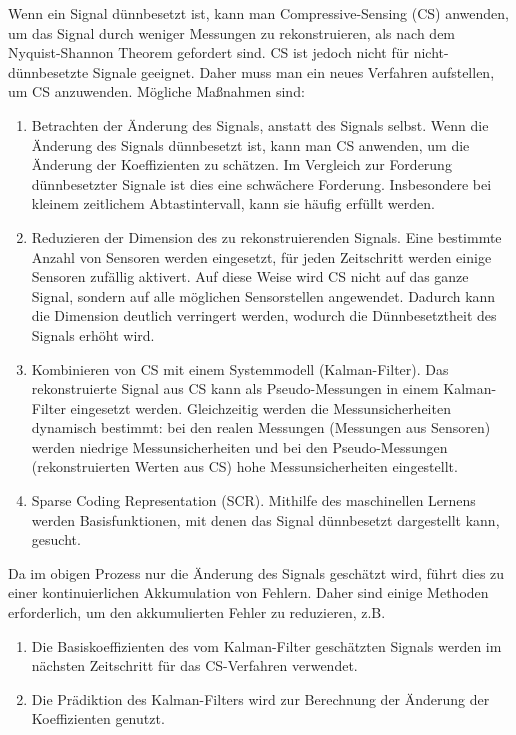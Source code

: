 \documentclass [a4paper, 10pt]{scrartcl}
\begin{document}
\Anfang

Wenn ein Signal dünnbesetzt ist, kann man Compressive-Sensing (CS) anwenden, um das Signal durch weniger Messungen zu rekonstruieren, als nach dem Nyquist-Shannon Theorem gefordert sind. CS ist jedoch nicht für nicht-dünnbesetzte Signale geeignet. Daher muss man ein neues Verfahren aufstellen, um CS anzuwenden. Mögliche Maßnahmen sind:
\begin{enumerate}
\item Betrachten der Änderung des Signals, anstatt des Signals selbst. Wenn die Änderung des Signals dünnbesetzt ist, kann man CS anwenden, um die Änderung der Koeffizienten zu schätzen. Im Vergleich zur Forderung dünnbesetzter Signale ist dies eine schwächere Forderung. Insbesondere bei kleinem zeitlichem Abtastintervall, kann sie häufig erfüllt werden.

\item Reduzieren der Dimension des zu rekonstruierenden Signals. Eine bestimmte Anzahl von Sensoren werden eingesetzt, für jeden Zeitschritt werden einige Sensoren zufällig aktivert. Auf diese Weise wird CS nicht auf das ganze Signal, sondern auf alle möglichen Sensorstellen angewendet. Dadurch kann die Dimension deutlich verringert werden, wodurch die Dünnbesetztheit des Signals erhöht wird.

\item Kombinieren von CS mit einem Systemmodell (Kalman-Filter). Das rekonstruierte Signal aus CS kann als Pseudo-Messungen in einem Kalman-Filter eingesetzt werden. Gleichzeitig werden die Messunsicherheiten dynamisch bestimmt: bei den realen Messungen  (Messungen aus Sensoren) werden niedrige Messunsicherheiten und bei den Pseudo-Messungen (rekonstruierten Werten aus CS) hohe Messunsicherheiten eingestellt.

\item Sparse Coding Representation (SCR). Mithilfe des maschinellen Lernens werden Basisfunktionen, mit denen das Signal dünnbesetzt dargestellt kann, gesucht.
\end{enumerate}

Da im obigen Prozess nur die Änderung des Signals geschätzt wird, führt dies zu einer kontinuierlichen Akkumulation von Fehlern. Daher sind einige Methoden erforderlich, um den akkumulierten Fehler zu reduzieren, z.B.
\begin{enumerate}
\item Die Basiskoeffizienten des vom Kalman-Filter geschätzten Signals werden im nächsten Zeitschritt für das CS-Verfahren verwendet.

\item Die Prädiktion des Kalman-Filters wird zur Berechnung der Änderung der Koeffizienten genutzt.
\end{enumerate}
\end{document}
